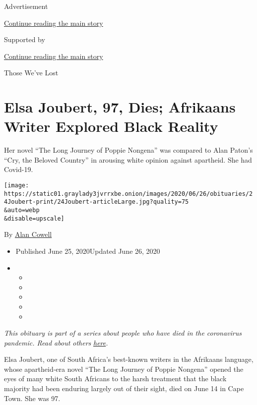 Advertisement

\protect\hyperlink{after-top}{Continue reading the main story}

Supported by

\protect\hyperlink{after-sponsor}{Continue reading the main story}

Those We've Lost

\hypertarget{elsa-joubert-97-dies-afrikaans-writer-explored-black-reality}{%
\section{Elsa Joubert, 97, Dies; Afrikaans Writer Explored Black
Reality}\label{elsa-joubert-97-dies-afrikaans-writer-explored-black-reality}}

Her novel ``The Long Journey of Poppie Nongena'' was compared to Alan
Paton's ``Cry, the Beloved Country'' in arousing white opinion against
apartheid. She had Covid-19.

\texttt{[image: https://static01.graylady3jvrrxbe.onion/images/2020/06/26/obituaries/24Joubert-print/24Joubert-articleLarge.jpg?quality=75\\\&auto=webp\\\&disable=upscale]}

By \href{https://www.nytimes3xbfgragh.onion/by/alan-cowell}{Alan Cowell}

\begin{itemize}
\item
  Published June 25, 2020Updated June 26, 2020
\item
  \begin{itemize}
  \item
  \item
  \item
  \item
  \item
  \end{itemize}
\end{itemize}

\emph{This obituary is part of a series about people who have died in
the coronavirus pandemic. Read about others}
\href{https://www.nytimes3xbfgragh.onion/interactive/2020/obituaries/people-died-coronavirus-obituaries.html}{\emph{here}}\emph{.}

Elsa Joubert, one of South Africa's best-known writers in the Afrikaans
language, whose apartheid-era novel ``The Long Journey of Poppie
Nongena'' opened the eyes of many white South Africans to the harsh
treatment that the black majority had been enduring largely out of their
sight, died on June 14 in Cape Town. She was 97.

